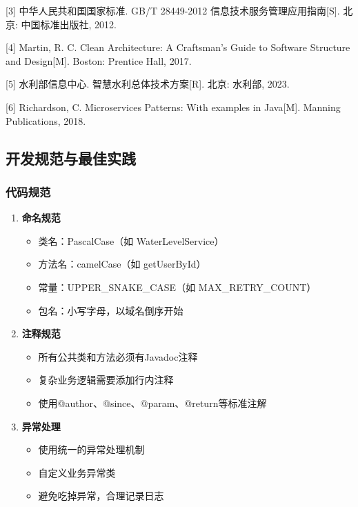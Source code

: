 {[}3{]} 中华人民共和国国家标准. GB/T 28449-2012 信息技术服务管理应用指南{[}S{]}. 北京: 中国标准出版社, 2012.

{[}4{]} Martin, R. C. Clean Architecture: A Craftsman's Guide to Software Structure and Design{[}M{]}. Boston: Prentice Hall, 2017.

{[}5{]} 水利部信息中心. 智慧水利总体技术方案{[}R{]}. 北京: 水利部, 2023.

{[}6{]} Richardson, C. Microservices Patterns: With examples in Java{[}M{]}. Manning Publications, 2018.

\subsection{开发规范与最佳实践}\label{ux5f00ux53d1ux89c4ux8303ux4e0eux6700ux4f73ux5b9eux8df5}

\subsubsection{代码规范}\label{ux4ee3ux7801ux89c4ux8303}

\begin{enumerate}
\def\labelenumi{\arabic{enumi}.}
\tightlist
\item
  \textbf{命名规范}

  \begin{itemize}
  \tightlist
  \item
    类名：PascalCase（如 WaterLevelService）
  \item
    方法名：camelCase（如 getUserById）
  \item
    常量：UPPER\_SNAKE\_CASE（如 MAX\_RETRY\_COUNT）
  \item
    包名：小写字母，以域名倒序开始
  \end{itemize}
\item
  \textbf{注释规范}

  \begin{itemize}
  \tightlist
  \item
    所有公共类和方法必须有Javadoc注释
  \item
    复杂业务逻辑需要添加行内注释
  \item
    使用@author、@since、@param、@return等标准注解
  \end{itemize}
\item
  \textbf{异常处理}

  \begin{itemize}
  \tightlist
  \item
    使用统一的异常处理机制
  \item
    自定义业务异常类
  \item
    避免吃掉异常，合理记录日志
  \end{itemize}
\end{enumerate}

